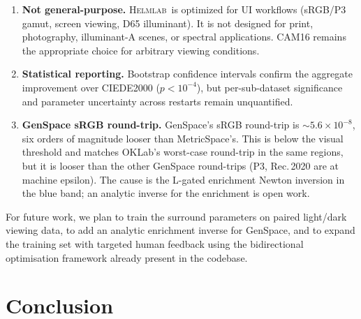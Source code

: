 \documentclass[11pt, twocolumn]{article}
\newcommand{\helmlab}{\textsc{Helmlab}}
\begin{document}
\begin{enumerate}
  \item \textbf{Not general-purpose.} \helmlab\ is optimized for UI
    workflows (sRGB/P3 gamut, screen viewing, D65 illuminant). It is
    not designed for print, photography, illuminant-A scenes, or
    spectral applications. CAM16 remains the appropriate choice for
    arbitrary viewing conditions.

  \item \textbf{Statistical reporting.} Bootstrap confidence intervals
    confirm the aggregate improvement over CIEDE2000 ($p < 10^{-4}$),
    but per-sub-dataset significance and parameter uncertainty across
    restarts remain unquantified.

  \item \textbf{GenSpace sRGB round-trip.} GenSpace's sRGB round-trip
    is $\sim 5.6\!\times\!10^{-8}$, six orders of magnitude looser than
    MetricSpace's. This is below the visual threshold and matches
    OKLab's worst-case round-trip in the same regions, but it is
    looser than the other GenSpace round-trips (P3, Rec.\,2020 are
    at machine epsilon). The cause is the L-gated enrichment Newton
    inversion in the blue band; an analytic inverse for the
    enrichment is open work.
\end{enumerate}

For future work, we plan to train the surround parameters on paired
light/dark viewing data, to add an analytic enrichment inverse for
GenSpace, and to expand the training set with targeted human
feedback using the bidirectional optimisation framework already
present in the codebase.


\section{Conclusion}
\label{sec:conclusion}
\end{document}
